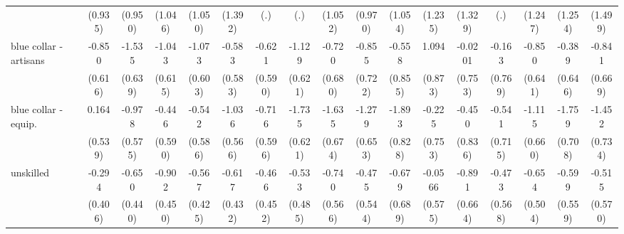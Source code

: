 {\begin{tabular}{l*{16}{c}}
                    &     (0.935)         &     (0.950)         &     (1.046)         &     (1.050)         &     (1.392)         &         (.)         &         (.)         &     (1.052)         &     (0.970)         &     (1.054)         &     (1.235)         &     (1.329)         &         (.)         &     (1.247)         &     (1.254)         &     (1.499)         \\
[1em]
blue collar - artisans&      -0.850         &      -1.535\sym{*}  &      -1.043         &      -1.073         &      -0.583         &      -0.621         &      -1.129         &      -0.720         &      -0.855         &      -0.558         &       1.094         &     -0.0201         &      -0.163         &      -0.850         &      -0.389         &      -0.841         \\
                    &     (0.616)         &     (0.639)         &     (0.615)         &     (0.603)         &     (0.583)         &     (0.590)         &     (0.621)         &     (0.680)         &     (0.722)         &     (0.855)         &     (0.873)         &     (0.753)         &     (0.769)         &     (0.641)         &     (0.646)         &     (0.669)         \\
[1em]
blue collar - equip.&       0.164         &      -0.978         &      -0.446         &      -0.542         &      -1.036         &      -0.716         &      -1.735\sym{**} &      -1.635\sym{*}  &      -1.279         &      -1.893\sym{*}  &      -0.225         &      -0.450         &      -0.541         &      -1.115         &      -1.759\sym{*}  &      -1.452\sym{*}  \\
                    &     (0.539)         &     (0.575)         &     (0.590)         &     (0.586)         &     (0.566)         &     (0.596)         &     (0.621)         &     (0.674)         &     (0.653)         &     (0.828)         &     (0.753)         &     (0.836)         &     (0.715)         &     (0.660)         &     (0.708)         &     (0.734)         \\
[1em]
unskilled           &      -0.294         &      -0.650         &      -0.902\sym{*}  &      -0.567         &      -0.617         &      -0.466         &      -0.533         &      -0.740         &      -0.475         &      -0.679         &     -0.0566         &      -0.891         &      -0.473         &      -0.654         &      -0.599         &      -0.515         \\
                    &     (0.406)         &     (0.440)         &     (0.450)         &     (0.425)         &     (0.432)         &     (0.452)         &     (0.485)         &     (0.566)         &     (0.544)         &     (0.689)         &     (0.575)         &     (0.664)         &     (0.568)         &     (0.504)         &     (0.559)         &     (0.570)         \\

\end{tabular}}
